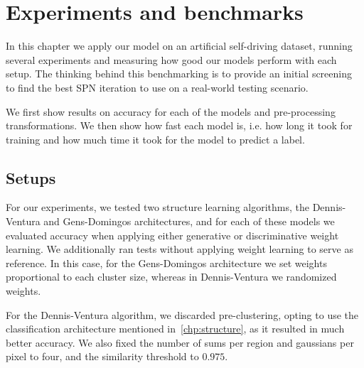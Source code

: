 
\chapter{Experiments and benchmarks}\label{chp:benchmarks}

In this chapter we apply our model on an artificial self-driving dataset, running several
experiments and measuring how good our models perform with each setup. The thinking behind this
benchmarking is to provide an initial screening to find the best SPN iteration to use on a
real-world testing scenario.

We first show results on accuracy for each of the models and pre-processing transformations.
We then show how fast each model is, i.e. how long it took for training and how much time it took
for the model to predict a label.

\section{Setups}

For our experiments, we tested two structure learning algorithms, the Dennis-Ventura and
Gens-Domingos architectures, and for each of these models we evaluated accuracy when applying
either generative or discriminative weight learning. We additionally ran tests without applying
weight learning to serve as reference. In this case, for the Gens-Domingos architecture we set
weights proportional to each cluster size, whereas in Dennis-Ventura we randomized weights.

For the Dennis-Ventura algorithm, we discarded pre-clustering, opting to use the classification
architecture mentioned in~\autoref{chp:structure}, as it resulted in much better accuracy. We also
fixed the number of sums per region and gaussians per pixel to four, and the similarity threshold
to $0.975$.

